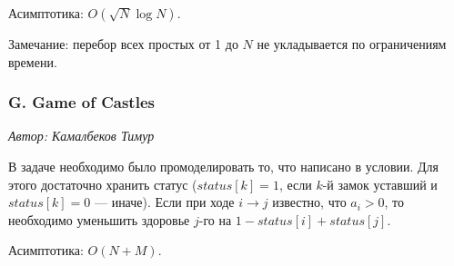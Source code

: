 \documentclass[11pt, a4paper]{article}
\newcommand{\problemauthor}[1]{
\begin{flushright}
\textit{Автор: #1}
\end{flushright}
}
\begin{document}
Асимптотика: $O(\sqrt{N} \log{N})$.

Замечание: перебор всех простых от 1 до $N$ не укладывается по ограничениям времени.



\subsubsection*{G. Game of Castles} 

\problemauthor{Камалбеков Тимур}

В задаче необходимо было промоделировать  то, что написано в условии. Для этого достаточно хранить статус ($status[k] = 1$, если $k$-й замок уставший и $status[k] = 0$ --- иначе). Если при ходе $i \rightarrow j$ известно, что $a_i > 0$, то необходимо уменьшить здоровье $j$-го на $1 - status[i] + status[j]$.

Асимптотика: $O(N + M)$.
\end{document}
